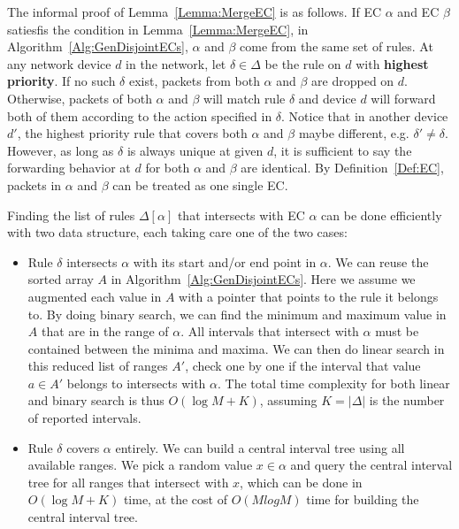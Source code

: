 The informal proof of Lemma~\ref{Lemma:MergeEC} is as follows.
If EC $\alpha$ and EC $\beta$ satiesfis the condition in Lemma~\ref{Lemma:MergeEC},
in Algorithm~\ref{Alg:GenDisjointECs}, $\alpha$ and $\beta$ come from
the same set of rules.
At any network device $d$ in the network, let $\delta \in \Delta$ be the rule on $d$ with
\textbf{highest priority}.
If no such $\delta$ exist, packets from both $\alpha$ and $\beta$ are dropped on $d$.
Otherwise, packets of both $\alpha$ and $\beta$ will match rule $\delta$ and
device $d$ will forward both of them according to the action specified in $\delta$.
Notice that in another device $d'$, the highest priority rule that covers both $\alpha$
and $\beta$ maybe different, e.g. $\delta' \neq \delta$.
However, as long as $\delta$ is always unique at given $d$,
it is sufficient to say the forwarding behavior at $d$ for both $\alpha$ and $\beta$ are identical.
By Definition~\ref{Def:EC},
packets in $\alpha$ and $\beta$ can be treated as one single EC.

Finding the list of rules $\Delta[\alpha]$ that intersects with EC $\alpha$ can be done
efficiently with two data structure,
each taking care one of the two cases\cite{FindIntersectionWiki}:
\begin{itemize}
\item Rule $\delta$ intersects $\alpha$ with its start and/or end point in $\alpha$.
        We can reuse the sorted array $A$ in Algorithm~\ref{Alg:GenDisjointECs}.
        Here we assume we augmented each value in $A$ with a pointer that points to
        the rule it belongs to.
        By doing binary search, we can find the minimum and maximum value in $A$ that
        are in the range of $\alpha$.
        All intervals that intersect with $\alpha$ must be contained between
        the minima and maxima.
        We can then do linear search in this reduced list of ranges $A'$,
        check one by one if the interval that value $a\in A'$ belongs to
        intersects with $\alpha$.
        The total time complexity for both linear and binary search is thus $O(\log M + K)$,
        assuming $K=|\Delta|$ is the number of reported intervals.
\item Rule $\delta$ covers $\alpha$ entirely. We can build
        a central interval tree\cite{ComputationalGeometryBook} using all available ranges.
        We pick a random value $x \in \alpha$ and query the central interval tree for
        all ranges that intersect with $x$, which can be done in $O(\log M + K)$ time,
        at the cost of $O(M log M)$ time for building the central interval tree. 
\end{itemize}

